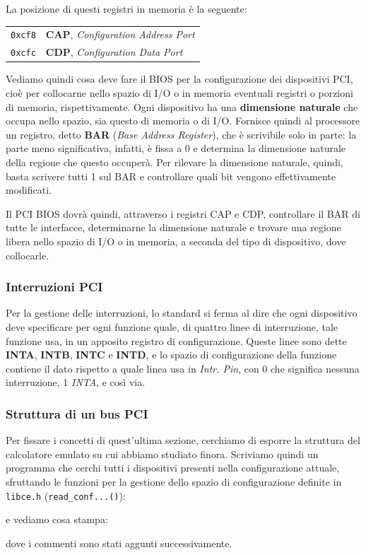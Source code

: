 \documentclass[a4paper,11pt]{article}
\begin{document}
La posizione di questi registri in memoria è la seguente:
\begin{table}[h!]
	\center
	\begin{tabular} { c | p{7cm} }
		\lstinline|0xcf8| & \textbf{CAP}, \textit{Configuration Address Port} \\
		\lstinline|0xcfc| & \textbf{CDP}, \textit{Configuration Data Port}	
	\end{tabular}
\end{table}

Vediamo quindi cosa deve fare il BIOS per la configurazione dei dispositivi PCI, cioè per collocarne nello spazio di I/O o in memoria eventuali registri o porzioni di memoria, rispettivamente.
Ogni dispositivo ha una \textbf{dimensione naturale} che occupa nello spazio, sia questo di memoria o di I/O.
Fornisce quindi al processore un registro, detto \textbf{BAR} (\textit{Base Address Register}), che è scrivibile solo in parte: la parte meno significativa, infatti, è fissa a 0 e determina la dimensione naturale della regione che questo occuperà.
Per rilevare la dimensione naturale, quindi, basta scrivere tutti 1 sul BAR e controllare quali bit vengono effettivamente modificati.

Il PCI BIOS dovrà quindi, attraverso i registri CAP e CDP, controllare il BAR di tutte le interfacce, determinarne la dimensione naturale e trovare una regione libera nello spazio di I/O o in memoria, a seconda del tipo di dispositivo, dove collocarle.

\subsubsection{Interruzioni PCI}
Per la gestione delle interruzioni, lo standard si ferma al dire che ogni dispositivo deve specificare per ogni funzione quale, di quattro linee di interruzione, tale funzione usa, in un apposito registro di configurazione.
Queste linee sono dette \textbf{INTA}, \textbf{INTB}, \textbf{INTC} e \textbf{INTD}, e lo spazio di configurazione della funzione contiene il dato rispetto a quale linea usa in \textit{Intr. Pin}, con 0 che significa nessuna interruzione, 1 \textit{INTA}, e così via.

\subsubsection{Struttura di un bus PCI}
Per fissare i concetti di quest'ultima sezione, cerchiamo di esporre la struttura del calcolatore emulato su cui abbiamo studiato finora.
Scriviamo quindi un programma che cerchi tutti i dispositivi presenti nella configurazione attuale, sfruttando le funzioni per la gestione dello spazio di configurazione definite in \lstinline|libce.h| (\lstinline|read_conf...()|):
\lstset{style = codestyle, language=c++}

e vediamo cosa stampa:

dove i commenti sono stati aggunti successivamente.
\end{document}
